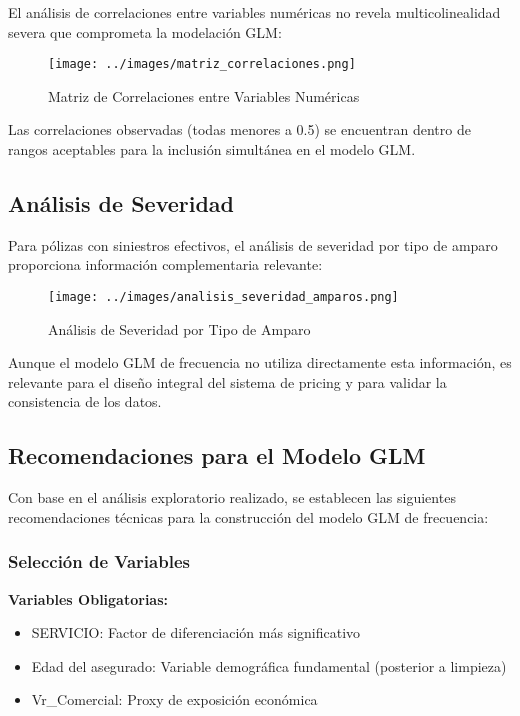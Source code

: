 El análisis de correlaciones entre variables numéricas no revela multicolinealidad severa que comprometa la modelación GLM:

\begin{figure}[H]
\centering
\texttt{[image: ../images/matriz\_correlaciones.png]}
\caption{Matriz de Correlaciones entre Variables Numéricas}
\end{figure}

Las correlaciones observadas (todas menores a 0.5) se encuentran dentro de rangos aceptables para la inclusión simultánea en el modelo GLM.

\subsection{Análisis de Severidad}

Para pólizas con siniestros efectivos, el análisis de severidad por tipo de amparo proporciona información complementaria relevante:

\begin{figure}[H]
\centering
\texttt{[image: ../images/analisis\_severidad\_amparos.png]}
\caption{Análisis de Severidad por Tipo de Amparo}
\end{figure}

Aunque el modelo GLM de frecuencia no utiliza directamente esta información, es relevante para el diseño integral del sistema de pricing y para validar la consistencia de los datos.

\subsection{Recomendaciones para el Modelo GLM}

Con base en el análisis exploratorio realizado, se establecen las siguientes recomendaciones técnicas para la construcción del modelo GLM de frecuencia:

\subsubsection{Selección de Variables}

\textbf{Variables Obligatorias:}
\begin{itemize}
\item SERVICIO: Factor de diferenciación más significativo
\item Edad del asegurado: Variable demográfica fundamental (posterior a limpieza)
\item Vr\_Comercial: Proxy de exposición económica
\end{itemize}

